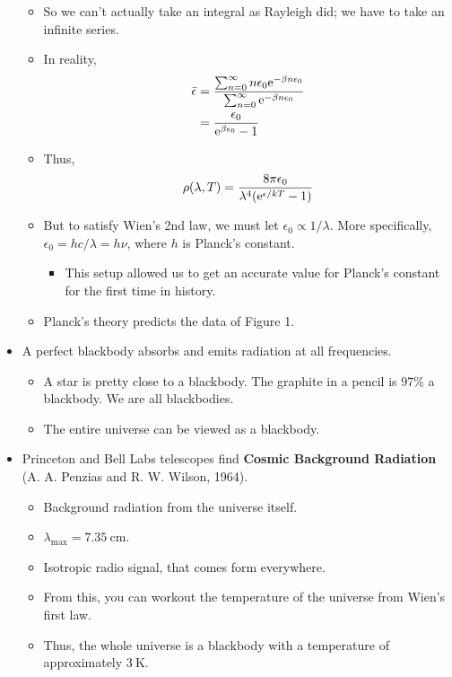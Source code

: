 \documentclass[../notes.tex]{subfiles}
\begin{document}
\begin{itemize}
\begin{itemize}
        \item So we can't actually take an integral as Rayleigh did; we have to take an infinite series.
        \item In reality,
        \begin{align*}
            \bar{\epsilon} &= \frac{\sum_{n=0}^\infty n\epsilon_0\e[-\beta n\epsilon_0]}{\sum_{n=0}^\infty\e[-\beta n\epsilon_0]}\\
            &= \frac{\epsilon_0}{\e[\beta\epsilon_0]-1}
        \end{align*}
        \item Thus,
        \begin{equation*}
            \rho(\lambda,T) = \frac{8\pi\epsilon_0}{\lambda^4(\e[\epsilon/kT]-1)}
        \end{equation*}
        \item But to satisfy Wien's 2nd law, we must let $\epsilon_0\propto 1/\lambda$. More specifically, $\epsilon_0=hc/\lambda=h\nu$, where $h$ is Planck's constant.
        \begin{itemize}
            \item This setup allowed us to get an accurate value for Planck's constant for the first time in history.
        \end{itemize}
        \item Planck's theory predicts the data of Figure 1.
    \end{itemize}
    \item A perfect blackbody absorbs and emits radiation at all frequencies.
    \begin{itemize}
        \item A star is pretty close to a blackbody. The graphite in a pencil is 97\% a blackbody. We are all blackbodies.
        \item The entire universe can be viewed as a blackbody.
    \end{itemize}
    \item Princeton and Bell Labs telescopes find \textbf{Cosmic Background Radiation} (A. A. Penzias and R. W. Wilson, 1964).
    \begin{itemize}
        \item Background radiation from the universe itself.
        \item $\lambda_\text{max}=\SI{7.35}{\centi\meter}$.
        \item Isotropic radio signal, that comes form everywhere.
        \item From this, you can workout the temperature of the universe from Wien's first law.
        \item Thus, the whole universe is a blackbody with a temperature of approximately $\SI{3}{\kelvin}$.
    \end{itemize}
\end{itemize}
\end{document}
